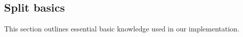 \subsection{Split basics} \label{sec:split-basics}
This section outlines essential basic knowledge used in our implementation.






